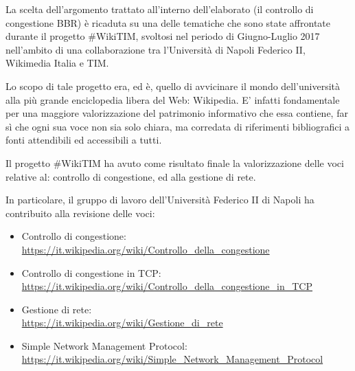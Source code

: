 
La scelta dell'argomento trattato all'interno dell'elaborato (il controllo di congestione BBR) è ricaduta su una delle tematiche che sono state affrontate durante il progetto \#{WikiTIM}, svoltosi nel periodo di Giugno-Luglio 2017 nell'ambito di una collaborazione tra l'Università di Napoli Federico II, Wikimedia Italia e TIM. \bigskip

Lo scopo di tale progetto era, ed è, quello di avvicinare il mondo dell'università alla più grande enciclopedia libera del Web: Wikipedia. E' infatti fondamentale per una maggiore valorizzazione del patrimonio informativo che essa contiene, far sì che ogni sua voce non sia solo chiara, ma corredata di riferimenti bibliografici a fonti attendibili ed accessibili a tutti. \bigskip

Il progetto \#{WikiTIM} ha avuto come risultato finale la valorizzazione delle voci relative al: controllo di congestione, ed alla gestione di rete. \bigskip

In particolare, il gruppo di lavoro dell'Università Federico II di Napoli ha contribuito alla revisione delle voci:

\begin{itemize}

\item Controllo di congestione: \\ 
\url{https://it.wikipedia.org/wiki/Controllo_della_congestione}

\item Controllo di congestione in TCP: \\
\url{https://it.wikipedia.org/wiki/Controllo_della_congestione_in_TCP}

\item Gestione di rete: \\
\url{https://it.wikipedia.org/wiki/Gestione_di_rete}

\item Simple Network Management Protocol: \\
\url{https://it.wikipedia.org/wiki/Simple_Network_Management_Protocol}

\end{itemize}  

